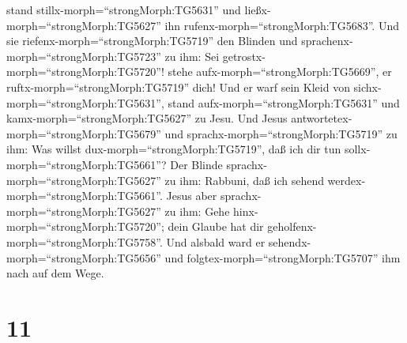 stand stillx-morph=``strongMorph:TG5631'' und
ließx-morph=``strongMorph:TG5627'' ihn
rufenx-morph=``strongMorph:TG5683''. Und sie
riefenx-morph=``strongMorph:TG5719'' den Blinden und
sprachenx-morph=``strongMorph:TG5723'' zu ihm: Sei
getrostx-morph=``strongMorph:TG5720''! stehe
aufx-morph=``strongMorph:TG5669'', er ruftx-morph=``strongMorph:TG5719''
dich!  Und er warf sein Kleid von
sichx-morph=``strongMorph:TG5631'', stand
aufx-morph=``strongMorph:TG5631'' und kamx-morph=``strongMorph:TG5627''
zu Jesu.  Und Jesus
antwortetex-morph=``strongMorph:TG5679'' und
sprachx-morph=``strongMorph:TG5719'' zu ihm: Was willst
dux-morph=``strongMorph:TG5719'', daß ich dir tun
sollx-morph=``strongMorph:TG5661''? Der Blinde
sprachx-morph=``strongMorph:TG5627'' zu ihm: Rabbuni, daß ich sehend
werdex-morph=``strongMorph:TG5661''.  Jesus aber
sprachx-morph=``strongMorph:TG5627'' zu ihm: Gehe
hinx-morph=``strongMorph:TG5720''; dein Glaube hat dir
geholfenx-morph=``strongMorph:TG5758''. Und alsbald ward er
sehendx-morph=``strongMorph:TG5656'' und
folgtex-morph=``strongMorph:TG5707'' ihm nach auf dem Wege.

\hypertarget{section-10}{%
\section{11}\label{section-10}}

